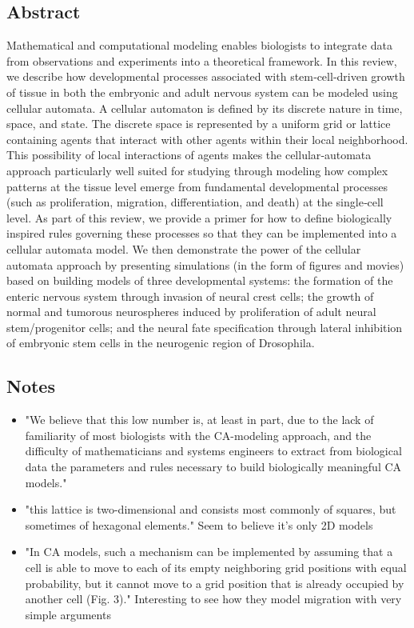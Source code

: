 \documentclass[11pt,a4paper]{article}
\begin{document}
\subsection*{Abstract}
Mathematical and computational modeling enables biologists to integrate data from observations and experiments into a theoretical framework. In this review, we describe how developmental processes associated with stem‐cell‐driven growth of tissue in both the embryonic and adult nervous system can be modeled using cellular automata. A cellular automaton is defined by its discrete nature in time, space, and state. The discrete space is represented by a uniform grid or lattice containing agents that interact with other agents within their local neighborhood. This possibility of local interactions of agents makes the cellular‐automata approach particularly well suited for studying through modeling how complex patterns at the tissue level emerge from fundamental developmental processes (such as proliferation, migration, differentiation, and death) at the single‐cell level. As part of this review, we provide a primer for how to define biologically inspired rules governing these processes so that they can be implemented into a cellular automata model. We then demonstrate the power of the cellular automata approach by presenting simulations (in the form of figures and movies) based on building models of three developmental systems: the formation of the enteric nervous system through invasion of neural crest cells; the growth of normal and tumorous neurospheres induced by proliferation of adult neural stem/progenitor cells; and the neural fate specification through lateral inhibition of embryonic stem cells in the neurogenic region of Drosophila. 

\subsection*{Notes}
\begin{itemize}
\item "We believe that this low number is, at least in part, due to the lack of familiarity of most biologists with the CA-modeling approach, and the difficulty of mathematicians and systems engineers to extract from biological data the parameters and rules necessary to build biologically meaningful CA models."
\item "this lattice is two-dimensional and consists most commonly of squares, but sometimes of hexagonal elements." Seem to believe it's only 2D models
\item "In CA models, such a mechanism can be implemented by assuming that a cell is able to move to each of its empty neighboring grid positions with equal probability, but it cannot move to a grid position that is already occupied by another cell (Fig. 3)." Interesting to see how they model migration with very simple arguments
\end{itemize}
\end{document}
